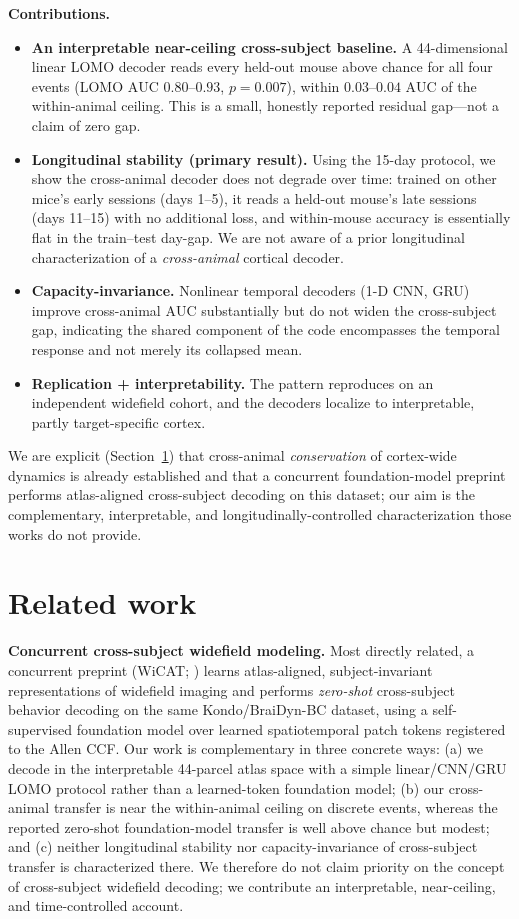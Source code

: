 \documentclass{article}
\newcommand{\auc}{\mathrm{AUC}}
\begin{document}
\textbf{Contributions.}
\begin{itemize}\itemsep2pt
\item \textbf{An interpretable near-ceiling cross-subject baseline.} A 44-dimensional linear LOMO
decoder reads every held-out mouse above chance for all four events (LOMO $\auc$ $0.80$--$0.93$,
$p=0.007$), within $0.03$--$0.04$ $\auc$ of the within-animal ceiling. This is a small, honestly
reported residual gap---not a claim of zero gap.
\item \textbf{Longitudinal stability (primary result).} Using the 15-day protocol, we show the
cross-animal decoder does not degrade over time: trained on other mice's early sessions
(days 1--5), it reads a held-out mouse's late sessions (days 11--15) with no additional loss, and
within-mouse accuracy is essentially flat in the train--test day-gap. We are not aware of a prior
longitudinal characterization of a \emph{cross-animal} cortical decoder.
\item \textbf{Capacity-invariance.} Nonlinear temporal decoders (1-D CNN, GRU) improve
cross-animal $\auc$ substantially but do not widen the cross-subject gap, indicating the shared
component of the code encompasses the temporal response and not merely its collapsed mean.
\item \textbf{Replication + interpretability.} The pattern reproduces on an independent widefield
cohort, and the decoders localize to interpretable, partly target-specific cortex.
\end{itemize}
We are explicit (Section~\ref{sec:related}) that cross-animal \emph{conservation} of cortex-wide
dynamics is already established and that a concurrent foundation-model preprint performs
atlas-aligned cross-subject decoding on this dataset; our aim is the complementary, interpretable,
and longitudinally-controlled characterization those works do not provide.

\section{Related work}
\label{sec:related}
\textbf{Concurrent cross-subject widefield modeling.} Most directly related, a concurrent preprint
(WiCAT; \citealp{wicat2026}) learns atlas-aligned, subject-invariant representations of widefield
imaging and performs \emph{zero-shot} cross-subject behavior decoding on the same
Kondo/BraiDyn-BC dataset, using a self-supervised foundation model over learned spatiotemporal
patch tokens registered to the Allen CCF. Our work is complementary in three concrete ways: (a)
we decode in the interpretable 44-parcel atlas space with a simple linear/CNN/GRU LOMO protocol
rather than a learned-token foundation model; (b) our cross-animal transfer is near the
within-animal ceiling on discrete events, whereas the reported zero-shot foundation-model transfer
is well above chance but modest; and (c) neither longitudinal stability nor capacity-invariance of
cross-subject transfer is characterized there. We therefore do not claim priority on the concept
of cross-subject widefield decoding; we contribute an interpretable, near-ceiling, and
time-controlled account.
\end{document}
